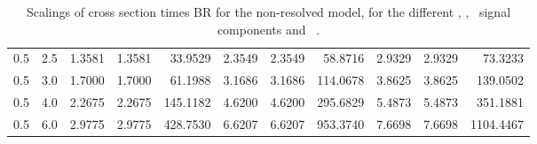 \begin{landscape}
\begin{table}[h!]
\begin{tabular}{ll rrr rrr rrr}
   0.5 & 2.5    & 1.3581 & 1.3581 & 33.9529  & 2.3549 & 2.3549 & 58.8716   & 2.9329 & 2.9329 & 73.3233 \\
   0.5 & 3.0    & 1.7000 & 1.7000 & 61.1988  & 3.1686 & 3.1686 & 114.0678  & 3.8625 & 3.8625 & 139.0502 \\
   0.5 & 4.0    & 2.2675 & 2.2675 & 145.1182 & 4.6200 & 4.6200 & 295.6829  & 5.4873 & 5.4873 & 351.1881 \\
   0.5 & 6.0    & 2.9775 & 2.9775 & 428.7530 & 6.6207 & 6.6207 & 953.3740  & 7.6698 & 7.6698 & 1104.4467 \\\hline
  \end{tabular}
  \caption[Scalings of $\sigma\times$BR for the signal components and \ ]{Scalings of cross section times BR for the non-resolved model, for the different \ttH, \tHq, \tHW\ signal components and \ .}\label{tab:xsbrscalingK6_0p5}
\end{table}


\end{landscape}

